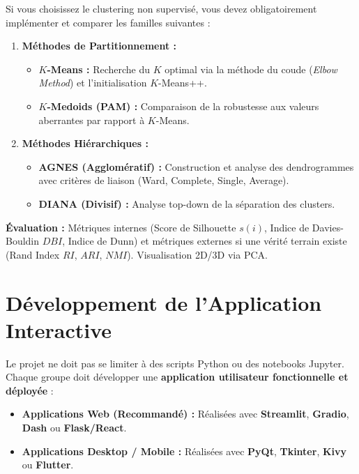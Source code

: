 \documentclass[11pt,a4paper]{article}
\begin{document}
\begin{tcolorbox}[colback=lightgray, colframe=sintefblue, title=\textbf{PARCOURS B : CLUSTERING NON SUPERVISÉ}, arc=2mm]
    Si vous choisissez le clustering non supervisé, vous devez obligatoirement implémenter et comparer les familles suivantes :
    \begin{enumerate}
        \item \textbf{Méthodes de Partitionnement :}
        \begin{itemize}
            \item \textbf{$K$-Means :} Recherche du $K$ optimal via la méthode du coude (\textit{Elbow Method}) et l'initialisation $K$-Means++.
            \item \textbf{$K$-Medoids (PAM) :} Comparaison de la robustesse aux valeurs aberrantes par rapport à $K$-Means.
        \end{itemize}
        \item \textbf{Méthodes Hiérarchiques :}
        \begin{itemize}
            \item \textbf{AGNES (Agglomératif) :} Construction et analyse des dendrogrammes avec critères de liaison (Ward, Complete, Single, Average).
            \item \textbf{DIANA (Divisif) :} Analyse top-down de la séparation des clusters.
        \end{itemize}
    \end{enumerate}
    \textbf{Évaluation :} Métriques internes (Score de Silhouette $s(i)$, Indice de Davies-Bouldin $DBI$, Indice de Dunn) et métriques externes si une vérité terrain existe (Rand Index $RI$, $ARI$, $NMI$). Visualisation 2D/3D via PCA.
\end{tcolorbox}

\section{Développement de l'Application Interactive}

Le projet ne doit pas se limiter à des scripts Python ou des notebooks Jupyter. Chaque groupe doit développer une \textbf{application utilisateur fonctionnelle et déployée} :
\begin{itemize}
    \item \textbf{Applications Web (Recommandé) :} Réalisées avec \textbf{Streamlit}, \textbf{Gradio}, \textbf{Dash} ou \textbf{Flask/React}.
    \item \textbf{Applications Desktop / Mobile :} Réalisées avec \textbf{PyQt}, \textbf{Tkinter}, \textbf{Kivy} ou \textbf{Flutter}.
\end{itemize}
\end{document}
